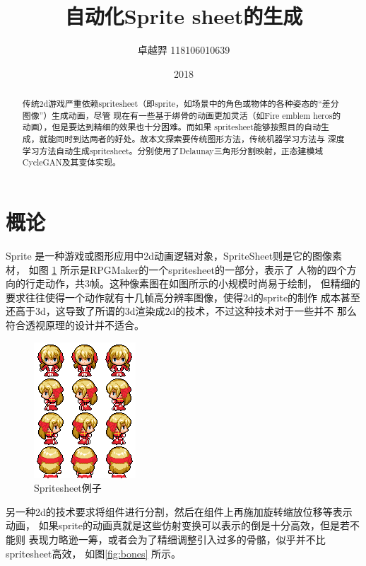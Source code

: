 \documentclass[twocolumn,11pt]{ctexart}
\title{自动化Sprite sheet的生成}
\author{卓越羿 118106010639}
\date{2018}
\begin{document}
\maketitle


\begin{abstract}
    传统2d游戏严重依赖spritesheet（即sprite，如场景中的角色或物体的各种姿态的“差分图像”）生成动画，尽管
    现在有一些基于绑骨的动画更加灵活（如Fire emblem heros的动画），但是要达到精细的效果也十分困难。而如果
    spritesheet能够按照目的自动生成，就能同时到达两者的好处。故本文探索要传统图形方法，传统机器学习方法与
    深度学习方法自动生成spritesheet。分别使用了Delaunay三角形分割映射，正态建模域CycleGAN及其变体实现。
\end{abstract}

\section{概论}

Sprite 是一种游戏或图形应用中2d动画逻辑对象，SpriteSheet则是它的图像素材，
如图 \ref{fig:highpriest} 所示是RPGMaker的一个spritesheet的一部分，表示了
人物的四个方向的行走动作，共3帧。这种像素图在如图所示的小规模时尚易于绘制，
但精细的要求往往使得一个动作就有十几帧高分辨率图像，使得2d的sprite的制作
成本甚至还高于3d，这导致了所谓的3d渲染成2d的技术，不过这种技术对于一些并不
那么符合透视原理的设计并不适合。


\begin{figure}[htb]
    \centering
    \includegraphics[width=0.3\linewidth]{H.png}
    \caption{Spritesheet例子}
    \label{fig:highpriest}
\end{figure}

另一种2d的技术要求将组件进行分割，然后在组件上再施加旋转缩放位移等表示动画，
如果sprite的动画真就是这些仿射变换可以表示的倒是十分高效，但是若不能则
表现力略逊一筹，或者会为了精细调整引入过多的骨骼，似乎并不比spritesheet高效，
如图\ref{fig:bones}  \cite{zhihu2d}
所示。
\end{document}

